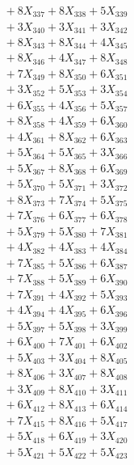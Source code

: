 \documentclass[a4paper,10pt]{article}
\begin{document}
{\begin{align}
&\;  + 8 X_{337} + 8 X_{338} + 5 X_{339} \\[0.5ex]\allowbreak
&\;  + 3 X_{340} + 3 X_{341} + 3 X_{342} \\[0.3ex]
&\;  + 8 X_{343} + 8 X_{344} + 4 X_{345} \\[0.3ex]
&\;  + 8 X_{346} + 4 X_{347} + 8 X_{348} \\[0.3ex]
&\;  + 7 X_{349} + 8 X_{350} + 6 X_{351} \\[0.3ex]
&\;  + 3 X_{352} + 5 X_{353} + 3 X_{354} \\[0.3ex]
&\;  + 6 X_{355} + 4 X_{356} + 5 X_{357} \\[0.3ex]
&\;  + 8 X_{358} + 4 X_{359} + 6 X_{360} \\[0.3ex]
&\;  + 4 X_{361} + 8 X_{362} + 6 X_{363} \\[0.3ex]
&\;  + 5 X_{364} + 5 X_{365} + 3 X_{366} \\[0.3ex]
&\;  + 5 X_{367} + 8 X_{368} + 6 X_{369} \\[0.5ex]\allowbreak
&\;  + 5 X_{370} + 5 X_{371} + 3 X_{372} \\[0.3ex]
&\;  + 8 X_{373} + 7 X_{374} + 5 X_{375} \\[0.3ex]
&\;  + 7 X_{376} + 6 X_{377} + 6 X_{378} \\[0.3ex]
&\;  + 5 X_{379} + 5 X_{380} + 7 X_{381} \\[0.3ex]
&\;  + 4 X_{382} + 4 X_{383} + 4 X_{384} \\[0.3ex]
&\;  + 7 X_{385} + 5 X_{386} + 6 X_{387} \\[0.3ex]
&\;  + 7 X_{388} + 5 X_{389} + 6 X_{390} \\[0.3ex]
&\;  + 7 X_{391} + 4 X_{392} + 5 X_{393} \\[0.3ex]
&\;  + 4 X_{394} + 4 X_{395} + 6 X_{396} \\[0.3ex]
&\;  + 5 X_{397} + 5 X_{398} + 3 X_{399} \\[0.5ex]\allowbreak
&\;  + 6 X_{400} + 7 X_{401} + 6 X_{402} \\[0.3ex]
&\;  + 5 X_{403} + 3 X_{404} + 8 X_{405} \\[0.3ex]
&\;  + 8 X_{406} + 3 X_{407} + 8 X_{408} \\[0.3ex]
&\;  + 3 X_{409} + 8 X_{410} + 3 X_{411} \\[0.3ex]
&\;  + 6 X_{412} + 8 X_{413} + 6 X_{414} \\[0.3ex]
&\;  + 7 X_{415} + 8 X_{416} + 5 X_{417} \\[0.3ex]
&\;  + 5 X_{418} + 6 X_{419} + 3 X_{420} \\[0.3ex]
&\;  + 5 X_{421} + 5 X_{422} + 5 X_{423} \\[0.3ex]

\end{align}}
\end{document}

